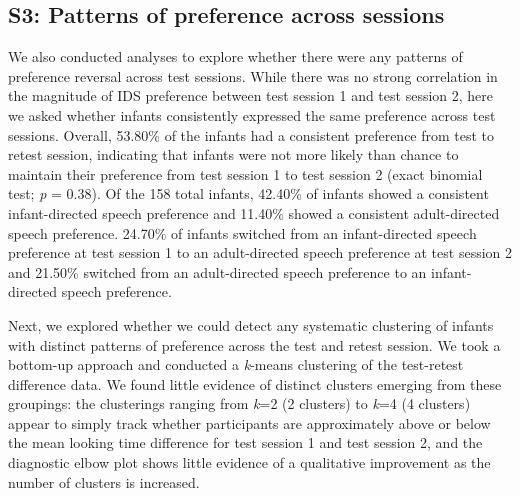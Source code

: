 \documentclass[
  man, donotrepeattitle,floatsintext]{apa6}
\begin{document}
\hypertarget{s3-patterns-of-preference-across-sessions}{%
\subsection{S3: Patterns of preference across sessions}\label{s3-patterns-of-preference-across-sessions}}

We also conducted analyses to explore whether there were any patterns of preference reversal across test sessions.
While there was no strong correlation in the magnitude of IDS preference between test session 1 and test session 2, here we asked whether infants consistently expressed the same preference across test sessions.
Overall, 53.80\% of the infants had a consistent preference from test to retest session, indicating that infants were not more likely than chance to maintain their preference from test session 1 to test session 2 (exact binomial test; \emph{p} =
0.38).
Of the 158 total infants, 42.40\% of infants showed a consistent infant-directed speech preference and 11.40\% showed a consistent adult-directed speech preference.
24.70\% of infants switched from an infant-directed speech preference at test session 1 to an adult-directed speech preference at test session 2 and 21.50\% switched from an adult-directed speech preference to an infant-directed speech preference.

Next, we explored whether we could detect any systematic clustering of infants with distinct patterns of preference across the test and retest session.
We took a bottom-up approach and conducted a \emph{k}-means clustering of the test-retest difference data.
We found little evidence of distinct clusters emerging from these groupings: the clusterings ranging from \emph{k}=2 (2 clusters) to \emph{k}=4 (4 clusters) appear to simply track whether participants are approximately above or below the mean looking time difference for test session 1 and test session 2, and the diagnostic elbow plot shows little evidence of a qualitative improvement as the number of clusters is increased.
\end{document}

